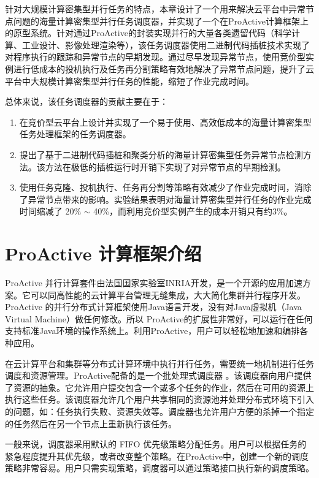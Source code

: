 针对大规模计算密集型并行任务的特点，本章设计了一个用来解决云平台中异常节点问题的海量计算密集型并行任务调度器，并实现了一个在ProActive计算框架上的原型系统。针对通过ProActive的封装实现并行的大量各类遗留代码（科学计算、工业设计、影像处理渲染等），该任务调度器使用二进制代码插桩技术实现了对程序执行的跟踪和异常节点的早期发现。通过尽早发现异常节点，使用竞价型实例进行低成本的投机执行及任务再分割策略有效地解决了异常节点问题，提升了云平台中大规模计算密集型并行任务的性能，缩短了作业完成时间。

总体来说，该任务调度器的贡献主要在于：
\begin{enumerate}
\item 在竞价型云平台上设计并实现了一个易于使用、高效低成本的海量计算密集型任务处理框架的任务调度器。
\item 提出了基于二进制代码插桩和聚类分析的海量计算密集型任务异常节点检测方法。该方法在极低的插桩运行时开销下实现了对异常节点的早期检测。
\item 使用任务克隆、投机执行、任务再分割等策略有效减少了作业完成时间，消除了异常节点带来的影响。实验结果表明对海量计算密集型并行任务的作业完成时间缩减了 20\% $\sim$ 40\%，而利用竞价型实例产生的成本开销只有约3\%。
\end{enumerate}

\section{ProActive 计算框架介绍}
ProActive \cite{ProActive} 并行计算套件由法国国家实验室INRIA开发，是一个开源的应用加速方案。它可以同高性能的云计算平台管理无缝集成，大大简化集群并行程序开发。ProActive 的并行分布式计算框架使用Java语言开发，没有对Java虚拟机（Java Virtual Machine）做任何修改。所以 ProActive的扩展性非常好，可以运行在任何支持标准Java环境的操作系统上。利用ProActive，用户可以轻松地加速和编排各种应用。

在云计算平台和集群等分布式计算环境中执行并行任务，需要统一地机制进行任务调度和资源管理。ProActive配备的是一个批处理式调度器 \cite{pascheduling}。该调度器向用户提供了资源的抽象。它允许用户提交包含一个或多个任务的作业，然后在可用的资源上执行这些任务。该调度器允许几个用户共享相同的资源池并处理分布式环境下引入的问题，如：任务执行失败、资源失效等。调度器也允许用户方便的杀掉一个指定的任务然后在另一个节点上重新执行该任务。

一般来说，调度器采用默认的 FIFO 优先级策略分配任务。用户可以根据任务的紧急程度提升其优先级，或者改变整个策略。在ProActive中，创建一个新的调度策略非常容易。用户只需实现策略，调度器可以通过策略接口执行新的调度策略。

